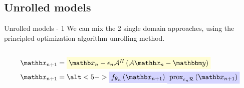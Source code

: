 \subsection{Unrolled models}
\begin{frame}{Unrolled models - 1}
    We can mix the 2 single domain approaches, using the principled optimization algorithm unrolling method.
    \begin{columns}[totalwidth=\textwidth]
        \begin{column}[]{0.3\textwidth}
            
            \begin{equation*}
                \begin{split}
                    \xb_{n+1} &= \highlight{yellow}{$\xb_n - \epsilon_n \mathcal{A}^H\left(\mathcal{A} \xb_n - \ybb\right)$}\\
                    \xb_{n+1} &= \alt<5->{\highlight{blue}{$f_{\thetab_n}\left(\xb_{n+1}\right)$}}{\highlight{blue}{$\operatorname{prox}_{\epsilon_n \mathcal{R}}\left(\xb_{n+1}\right)$}}
                \end{split}
            \end{equation*}
            

\end{column}
\end{columns}
\end{frame}
